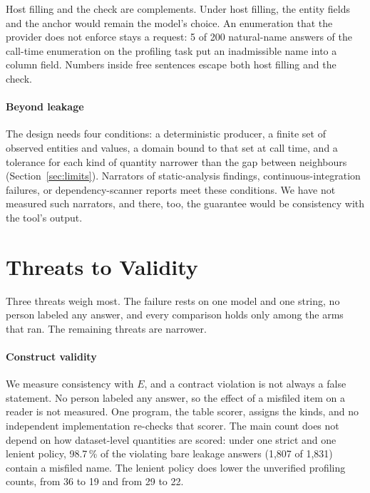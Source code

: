 \documentclass[journal]{IEEEtran}
\begin{document}
Host filling and the check are complements. Under host filling, the entity
fields and the anchor would remain the model's choice. An enumeration that the
provider does not enforce stays a request: 5 of 200 natural-name answers of the
call-time enumeration on the profiling task put an inadmissible name into a
column field. Numbers inside free sentences escape both host filling and the
check.

\paragraph{Beyond leakage}
The design needs four conditions: a deterministic producer, a finite set of
observed entities and values, a domain bound to that set at call time, and a
tolerance for each kind of quantity narrower than the gap between neighbours
(Section~\ref{sec:limits}). Narrators of static-analysis findings,
continuous-integration failures, or dependency-scanner reports meet these
conditions. We have not measured such narrators, and there, too, the guarantee
would be consistency with the tool's output.

\section{Threats to Validity}\label{sec:threats}

Three threats weigh most. The failure rests on one model and one string, no
person labeled any answer, and every comparison holds only among the arms that
ran. The remaining threats are narrower.

\paragraph{Construct validity}
We measure consistency with $E$, and a contract violation is not always a false
statement. No person labeled any answer, so the effect of a misfiled item on a
reader is not measured. One program, the table scorer, assigns the kinds, and no
independent implementation re-checks that scorer. The main count does not depend
on how dataset-level quantities are scored: under one strict and one lenient
policy, 98.7\,\% of the violating bare leakage answers (1{,}807 of 1{,}831)
contain a misfiled name. The lenient policy does lower the unverified profiling
counts, from 36 to 19 and from 29 to 22.
\end{document}
